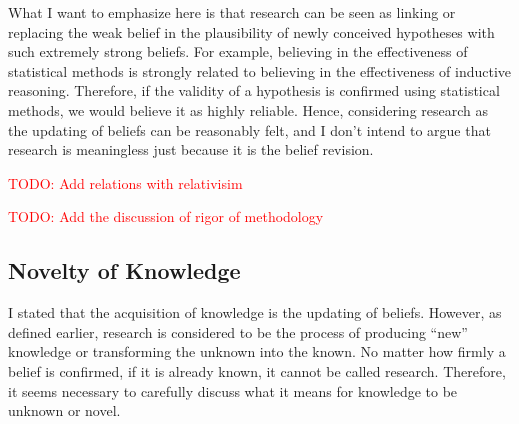 \documentclass{book}
\begin{document}
What I want to emphasize here is that research can be seen as linking or replacing the weak belief in the plausibility of newly conceived hypotheses with such extremely strong beliefs. For example, believing in the effectiveness of statistical methods is strongly related to believing in the effectiveness of inductive reasoning. Therefore, if the validity of a hypothesis is confirmed using statistical methods, we would believe it as highly reliable. Hence, considering research as the updating of beliefs can be reasonably felt, and I don't intend to argue that research is meaningless just because it is the belief revision.

\textcolor{red}{TODO: Add relations with relativisim}


\textcolor{red}{TODO: Add the discussion of rigor of methodology}

\subsection{Novelty of Knowledge}
I stated that the acquisition of knowledge is the updating of beliefs. However, as defined earlier, research is considered to be the process of producing ``new'' knowledge or transforming the unknown into the known. No matter how firmly a belief is confirmed, if it is already known, it cannot be called research. Therefore, it seems necessary to carefully discuss what it means for knowledge to be unknown or novel.
\end{document}
